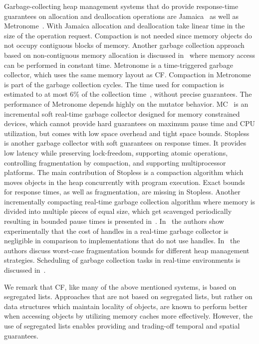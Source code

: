 \documentclass{amsart}
\begin{document}
Garbage-collecting heap management systems that do provide response-time
guarantees on allocation and deallocation operations are Jamaica~\cite{Sie2}
as well as Metronome~\cite{Bac2}.  With Jamaica allocation and deallocation take
linear time in the size of the operation request.  Compaction is not needed
since memory objects do not occupy contiguous blocks of memory. Another garbage
collection approach based on non-contiguous memory allocation is discussed
in~\cite{Pizlo10} where memory access can be performed in constant time.
Metronome is a time-triggered garbage collector, which uses the same memory
layout as CF.  Compaction in Metronome is part of the garbage collection
cycles. The time used for compaction is estimated to at most 6\% of the
collection time~\cite{Bac1}, without precise guarantees. The performance of
Metronome depends highly on the mutator behavior.  MC~\cite{Sac2} is an
incremental soft real-time garbage collector designed for memory constrained
devices, which cannot provide hard guarantees on maximum pause time and CPU
utilization, but comes with low space overhead and tight space bounds.
Stopless~\cite{Piz1} is another garbage collector with soft guarantees on
response times. It provides low latency while preserving lock-freedom,
supporting atomic operations, controlling fragmentation by compaction, and
supporting multiprocessor platforms. The main contribution of Stopless is a
compaction algorithm which moves objects in the heap concurrently with program
execution. Exact bounds for response times, as well as fragmentation, are
missing in Stopless. Another incrementally compacting real-time garbage
collection algorithm where memory is divided into multiple pieces of equal
size, which get scavenged periodically resulting in bounded pause times is
presented in~\cite{Nilsen09}.  In~\cite{Kalibera11} the authors show
experimentally that the cost of handles in a real-time garbage collector is
negligible in comparison to implementations that do not use handles.
In~\cite{Bendersky11} the authors discuss worst-case fragmentation bounds for
different heap management strategies. Scheduling of garbage collection tasks
in real-time environments is discussed in~\cite{Schoeberl10}.

We remark that CF, like many of the above mentioned systems, is based
on segregated lists.  Approaches that are not based on segregated
lists, but rather on data structures which maintain locality of
objects, are known to perform better when accessing objects by
utilizing memory caches more effectively.  However, the use of
segregated lists enables providing and trading-off temporal and
spatial guarantees.
\end{document}
